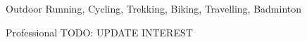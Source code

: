 



\begin{cvskills}
  \cvskill
    {Outdoor} %
    {Running, Cycling, Trekking, Biking, Travelling, Badminton} %

  \cvskill
    {Professional} %
    {TODO: UPDATE INTEREST} %

\end{cvskills}
